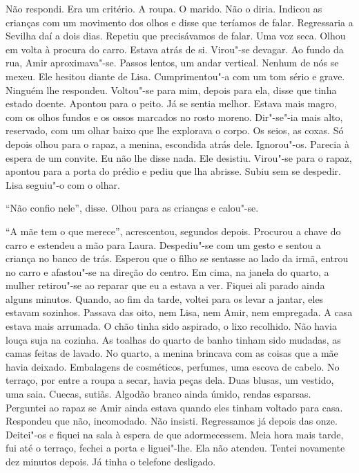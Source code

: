 Não respondi. Era um critério. A roupa. O marido. Não o diria. Indicou
as crianças com um movimento dos olhos e disse que teríamos de falar.
Regressaria a Sevilha daí a dois dias. Repetiu que precisávamos de
falar. Uma voz seca. Olhou em volta à procura do carro. Estava atrás de
si. Virou"-se devagar. Ao fundo da rua, Amir aproximava"-se. Passos
lentos, um andar vertical. Nenhum de nós se mexeu. Ele hesitou diante de
Lisa. Cumprimentou"-a com um tom sério e grave. Ninguém lhe respondeu.
Voltou"-se para mim, depois para ela, disse que tinha estado doente.
Apontou para o peito. Já se sentia melhor. Estava mais magro, com os
olhos fundos e os ossos marcados no rosto moreno. Dir"-se"-ia mais alto,
reservado, com um olhar baixo que lhe explorava o corpo. Os seios, as
coxas. Só depois olhou para o rapaz, a menina, escondida atrás dele.
Ignorou"-os. Parecia à espera de um convite. Eu não lhe disse nada. Ele
desistiu. Virou"-se para o rapaz, apontou para a porta do prédio e pediu
que lha abrisse. Subiu sem se despedir. Lisa seguiu"-o com o olhar.

``Não confio nele'',
disse. Olhou para as crianças e calou"-se.

``A mãe tem o que merece'',
acrescentou, segundos depois. Procurou a chave do carro e estendeu a mão
para Laura. Despediu"-se com um gesto e sentou a criança no banco de
trás. Esperou que o filho se sentasse ao lado da irmã, entrou no carro e
afastou"-se na direção do centro. Em cima, na janela do quarto, a
mulher retirou"-se ao reparar que eu a estava a ver. Fiquei ali parado
ainda alguns minutos. Quando, ao fim da tarde, voltei para os levar a
jantar, eles estavam sozinhos. Passava das oito, nem Lisa, nem Amir, nem
empregada. A casa estava mais arrumada. O chão tinha sido aspirado, o
lixo recolhido. Não havia louça suja na cozinha. As toalhas do quarto de
banho tinham sido mudadas, as camas feitas de lavado. No quarto, a
menina brincava com as coisas que a mãe havia deixado. Embalagens de
cosméticos, perfumes, uma escova de cabelo. No terraço, por entre a
roupa a secar, havia peças dela. Duas blusas, um vestido, uma saia.
Cuecas, sutiãs. Algodão branco ainda úmido, rendas esparsas. Perguntei
ao rapaz se Amir ainda estava quando eles tinham voltado para casa.
Respondeu que não, incomodado. Não insisti. Regressamos já depois das
onze. Deitei"-os e fiquei na sala à espera de que adormecessem. Meia
hora mais tarde, fui até o terraço, fechei a porta e liguei"-lhe. Ela
não atendeu. Tentei novamente dez minutos depois. Já tinha o telefone
desligado.

